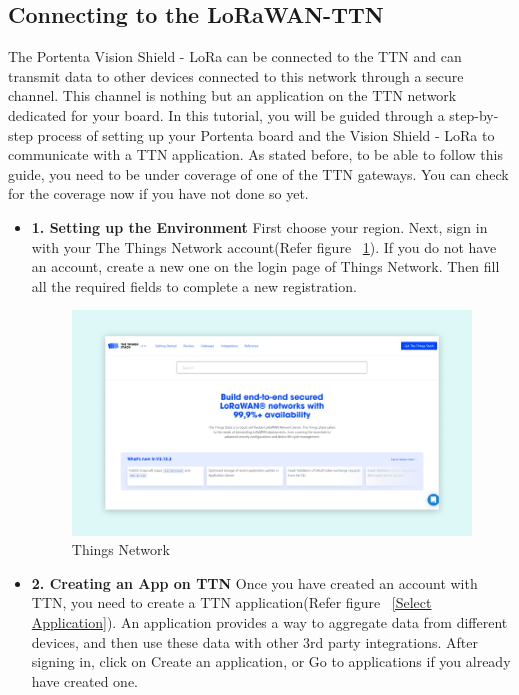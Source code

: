 \subsection{Connecting to the LoRaWAN-TTN}
The Portenta Vision Shield - LoRa can be connected to the TTN and can transmit data to other devices connected to this network through a secure channel. This channel is nothing but an application on the TTN network dedicated for your board. In this tutorial, you will be guided through a step-by-step process of setting up your Portenta board and the Vision Shield - LoRa to communicate with a TTN application. As stated before, to be able to follow this guide, you need to be under coverage of one of the TTN gateways. You can check for the coverage now if you have not done so yet. \cite{ArduinoTTN:2024}
\begin{itemize}
	
	\item \textbf{1. Setting up the Environment} First choose your region. Next, sign in with your The Things Network account(Refer figure ~\ref{Things Network}). If you do not have an account, create a new one on the login page of Things Network. Then fill all the required fields to complete a new registration.
	
	\begin{figure}
		\begin{center}
			\includegraphics[width=0.7\linewidth]{Images/LORA/ThingsNetwork.png}
			\caption{Things Network}
			\label{Things Network}
		\end{center}
	\end{figure}
	
	\item \textbf{2. Creating an App on TTN} Once you have created an account with TTN, you need to create a TTN application(Refer figure ~\ref{Select Application}). An application provides a way to aggregate data from different devices, and then use these data with other 3rd party integrations. After signing in, click on Create an application, or Go to applications if you already have created one. \cite{ArduinoTTN:2024}
	

\end{itemize}
